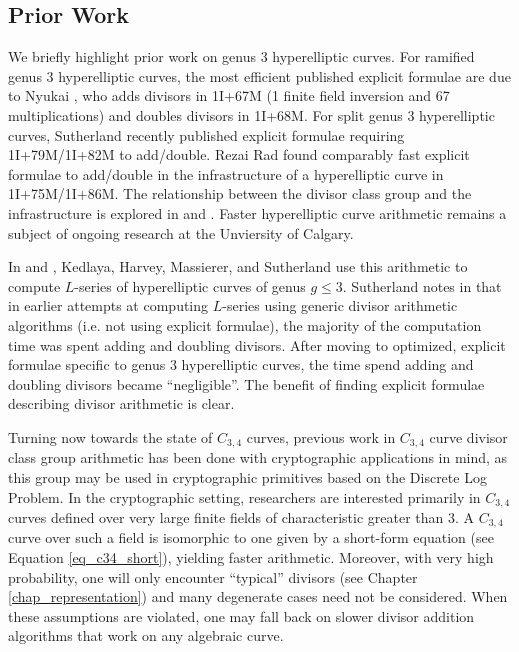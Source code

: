 
\subsection{Prior Work}

We briefly highlight prior work on genus 3 hyperelliptic curves.
For ramified genus 3 hyperelliptic curves, the most efficient published explicit formulae
are due to Nyukai \cite{nyukai06-1} \cite{nyukai06-2},
who adds divisors in 1I+67M (1 finite field inversion and 67 multiplications) and doubles divisors in 1I+68M.
For split genus 3 hyperelliptic curves, Sutherland \cite{sutherland18} recently published explicit formulae
requiring 1I+79M/1I+82M to add/double.
Rezai Rad \cite{rezairad16} \cite{rezairad19} found comparably fast explicit formulae to add/double
in the infrastructure of a hyperelliptic curve in 1I+75M/1I+86M.
The relationship between the divisor class group and the infrastructure is explored in \cite{rezairad16} and \cite{rezairad19}.
Faster hyperelliptic curve arithmetic remains a subject of ongoing research at the Unviersity of Calgary.

In \cite{kedlaya08} and \cite{harvey16}, Kedlaya, Harvey, Massierer, and Sutherland use this arithmetic to compute $L$-series of hyperelliptic curves of genus $g \leq 3$.
Sutherland notes in \cite{sutherland18} that in earlier attempts at computing $L$-series using generic divisor arithmetic algorithms (i.e. not using explicit formulae),
the majority of the computation time was spent adding and doubling divisors.
After moving to optimized, explicit formulae specific to genus 3 hyperelliptic curves, the time spend adding and doubling divisors became ``negligible''.
The benefit of finding explicit formulae describing divisor arithmetic is clear.

Turning now towards the state of $C_{3,4}$ curves, previous work in $C_{3,4}$ curve divisor class group arithmetic
has been done with cryptographic applications in mind, as this group may be used in cryptographic primitives based on the Discrete Log Problem.
In the cryptographic setting, researchers are interested primarily in $C_{3,4}$ curves defined over very large finite fields
of characteristic greater than 3.
A $C_{3,4}$ curve over such a field is isomorphic to one given by a short-form equation (see Equation \ref{eq_c34_short}), yielding faster arithmetic.
Moreover, with very high probability, one will only encounter ``typical'' divisors (see Chapter \ref{chap_representation})
and many degenerate cases need not be considered.
When these assumptions are violated, one may fall back on slower divisor addition algorithms that work on any algebraic curve.

